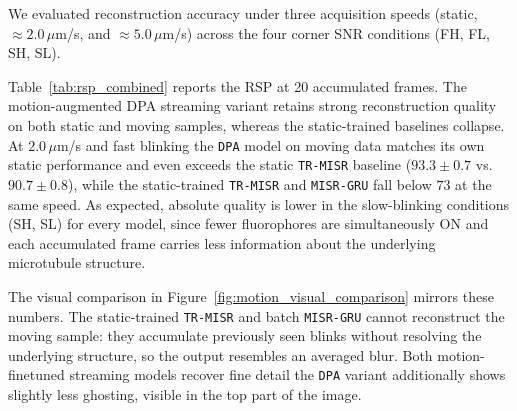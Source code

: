 We evaluated reconstruction accuracy under three acquisition speeds (static,
$\approx 2.0\,\mu$m/s, and $\approx 5.0\,\mu$m/s) across the four corner SNR conditions
(FH, FL, SH, SL).

Table~\ref{tab:rsp_combined} reports the RSP at 20 accumulated frames. The motion-augmented
DPA streaming variant retains strong reconstruction quality on both static and moving samples, whereas the
static-trained baselines collapse. At $2.0\,\mu$m/s and fast blinking the \texttt{DPA}
model on moving data matches its own static performance and even exceeds the static
\texttt{TR-MISR} baseline ($93.3 \pm 0.7$ vs.\ $90.7 \pm 0.8$), while the static-trained
\texttt{TR-MISR} and \texttt{MISR-GRU} fall below $73$ at the same speed. As expected,
absolute quality is lower in the slow-blinking conditions (SH, SL) for every model, since
fewer fluorophores are simultaneously ON and each accumulated frame carries less
information about the underlying microtubule structure.

The visual comparison in Figure~\ref{fig:motion_visual_comparison} mirrors these numbers.
The static-trained \texttt{TR-MISR} and batch \texttt{MISR-GRU} cannot reconstruct the
moving sample: they accumulate previously seen blinks without resolving the underlying
structure, so the output resembles an averaged blur. Both motion-finetuned streaming models
recover fine detail the \texttt{DPA} variant additionally shows slightly less
ghosting, visible in the top part of the image.

